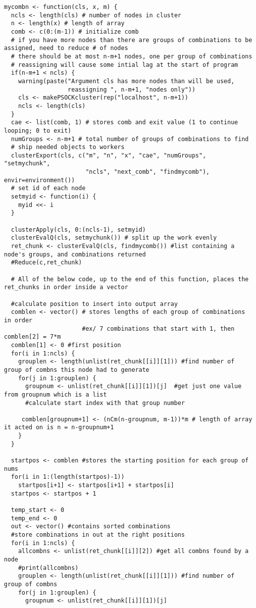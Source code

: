 {\begin{lstlisting}
mycombn <- function(cls, x, m) {
  ncls <- length(cls) # number of nodes in cluster
  n <- length(x) # length of array
  comb <- c(0:(m-1)) # initialize comb
  # if you have more nodes than there are groups of combinations to be assigned, need to reduce # of nodes
  # there should be at most n-m+1 nodes, one per group of combinations
  # reassigning will cause some intial lag at the start of program
  if(n-m+1 < ncls) {
    warning(paste("Argument cls has more nodes than will be used,
                  reassigning ", n-m+1, "nodes only"))
    cls <- makePSOCKcluster(rep("localhost", n-m+1))
    ncls <- length(cls)
  }
  cae <- list(comb, 1) # stores comb and exit value (1 to continue looping; 0 to exit)
  numGroups <- n-m+1 # total number of groups of combinations to find
  # ship needed objects to workers
  clusterExport(cls, c("m", "n", "x", "cae", "numGroups", "setmychunk",
                       "ncls", "next_comb", "findmycomb"), envir=environment())
  # set id of each node
  setmyid <- function(i) {
    myid <<- i
  }
  
  clusterApply(cls, 0:(ncls-1), setmyid)
  clusterEvalQ(cls, setmychunk()) # split up the work evenly
  ret_chunk <- clusterEvalQ(cls, findmycomb()) #list containing a node's groups, and combinations returned
  #Reduce(c,ret_chunk)
  
  # All of the below code, up to the end of this function, places the ret_chunks in order inside a vector

  #calculate position to insert into output array
  comblen <- vector() # stores lengths of each group of combinations in order
                      #ex/ 7 combinations that start with 1, then comblen[2] = 7*m
  comblen[1] <- 0 #first position
  for(i in 1:ncls) { 
    grouplen <- length(unlist(ret_chunk[[i]][1])) #find number of group of combns this node had to generate
    for(j in 1:grouplen) { 
      groupnum <- unlist(ret_chunk[[i]][1])[j]  #get just one value from groupnum which is a list
      #calculate start index with that group number
      
     comblen[groupnum+1] <- (nCm(n-groupnum, m-1))*m # length of array it acted on is n = n-groupnum+1     
    }
  }
      
  startpos <- comblen #stores the starting position for each group of nums
  for(i in 1:(length(startpos)-1))
    startpos[i+1] <- startpos[i+1] + startpos[i]
  startpos <- startpos + 1  
  
  temp_start <- 0
  temp_end <- 0 
  out <- vector() #contains sorted combinations
  #store combinations in out at the right positions
  for(i in 1:ncls) {
    allcombns <- unlist(ret_chunk[[i]][2]) #get all combns found by a node
    #print(allcombns)
    grouplen <- length(unlist(ret_chunk[[i]][1])) #find number of group of combns
    for(j in 1:grouplen) {
      groupnum <- unlist(ret_chunk[[i]][1])[j]
      

\end{lstlisting}}
